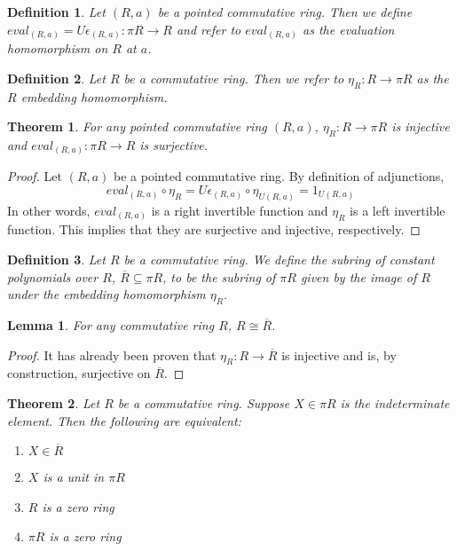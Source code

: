 \documentclass[12pt]{article}
\newtheorem{defn}{Definition}
\newtheorem{lem}{Lemma}
\newtheorem{thm}{Theorem}
\begin{document}
\begin{defn}
  Let $(R,a)$ be a pointed commutative ring. Then we define $eval_{(R,a)}=U\epsilon_{(R,a)}:\pi R \to R$ and refer to $eval_{(R,a)}$ as the evaluation homomorphism on $R$ at $a$.
\end{defn}

\begin{defn}
  Let $R$ be a commutative ring. Then we refer to $\eta_{R}:R\to\pi R$ as the $R$ embedding homomorphism.
\end{defn}

\begin{thm}
  For any pointed commutative ring $(R,a)$, $\eta_{R}:R\to\pi R$ is injective and $eval_{(R,a)}:\pi R\to R$ is surjective.
\end{thm}

\begin{proof}
  Let $(R,a)$ be a pointed commutative ring. By definition of adjunctions, $$eval_{(R,a)}\circ\eta_{R} = U\epsilon_{(R,a)}\circ\eta_{U(R,a)} = 1_{U(R,a)}$$ In other words, $eval_{(R,a)}$ is a right invertible function and $\eta_{R}$ is a left invertible function. This implies that they are surjective and injective, respectively.
\end{proof}

\begin{defn}
  Let $R$ be a commutative ring. We define the subring of constant polynomials over $R$, $\overline{R}\subseteq\pi R$, to be the subring of $\pi R$ given by the image of $R$ under the embedding homomorphism $\eta_R$.
\end{defn}

\begin{lem}
  For any commutative ring $R$, $R \cong \overline{R}$.
\end{lem}

\begin{proof}
  It has already been proven that $\eta_R:R\to\overline{R}$ is injective and is, by construction, surjective on $\overline{R}$.
\end{proof}

\begin{thm}
  Let $R$ be a commutative ring. Suppose $X\in\pi R$ is the indeterminate element. Then the following are equivalent:
  \begin{enumerate}
    \item $X\in\overline{R}$
    \item $X$ is a unit in $\pi R$
    \item $R$ is a zero ring
    \item $\pi R$ is a zero ring
  \end{enumerate}
\end{thm}
\end{document}
